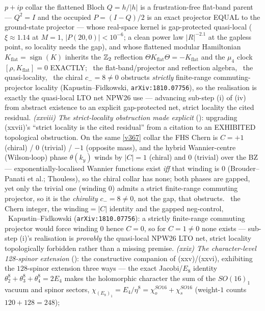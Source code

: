 $p{+}ip$ collar the flattened Bloch $Q{=}h/|h|$ is a frustration-free flat-band parent --- $Q^2{=}I$ and the
occupied $P{=}(I{-}Q)/2$ is an exact projector EQUAL to the ground-state projector --- whose real-space kernel is
gap-protected quasi-local ($\xi{\approx}1.14$ at $M{=}1$, $|P(20,0)|{<}10^{-6}$; a clean power law $|R|^{-2.1}$ at the
gapless point, so locality needs the gap), and whose flattened modular Hamiltonian $K_{\mathrm{flat}}{=}
\operatorname{sign}(K)$ inherits the $\mathbb Z_2$ reflection $\Theta K_{\mathrm{flat}}\Theta{=}{-}K_{\mathrm{flat}}$ and the
$\mu_4$ clock $[\rho,K_{\mathrm{flat}}]{=}0$ EXACTLY; \mE\ the flat-band/projector and reflection algebra, \mC\ the
quasi-locality, \mO\ the chiral $c_-{=}8{\neq}0$ obstructs \emph{strictly} finite-range commuting-projector locality
(Kapustin--Fidkowski, \texttt{arXiv:1810.07756}), so the realisation is exactly the quasi-local LTO net NPW26 use ---
advancing sub-step (i) of (iv) from abstract existence to an explicit gap-protected net, strict locality the cited
residual. \emph{(xxviii) The strict-locality obstruction made explicit} ():
upgrading (xxvii)'s ``strict locality is the cited residual'' from a citation to an EXHIBITED topological
obstruction. On the same \vref{v367} collar the FHS Chern is $C{=}{+}1$ (chiral) / $0$ (trivial) / $-1$
(opposite mass), and the hybrid Wannier-centre (Wilson-loop) phase $\theta(k_y)$ winds by $|C|{=}1$ (chiral) and
$0$ (trivial) over the BZ --- exponentially-localised Wannier functions exist \emph{iff} that winding is $0$
(Brouder--Panati et al.; Thouless), so the chiral collar has none; both phases are gapped, yet only the trivial one
(winding $0$) admits a strict finite-range commuting projector, so it is the \emph{chirality} $c_-{=}8{\neq}0$, not
the gap, that obstructs. \mE\ the Chern integer, the winding$={}|C|$ identity and the gapped neg-control, \mC\mO\
Kapustin--Fidkowski (\texttt{arXiv:1810.07756}): a strictly finite-range commuting projector would force winding
$0$ hence $C{=}0$, so for $C{=}1{\neq}0$ none exists --- sub-step (i)'s realisation is \emph{provably} the
quasi-local NPW26 LTO net, strict locality topologically forbidden rather than a missing premise. \emph{(xxix) The
character-level 128-spinor extension} (\veri{v462\_seam\_spinor\_continuum.py}): the constructive companion of
(xxv)/(xxvi), exhibiting the $128$-spinor extension three ways --- the exact Jacobi/$E_8$ identity
$\theta_2^8{+}\theta_3^8{+}\theta_4^8{=}2E_4$ makes the holomorphic character the sum of the $SO(16)_1$ vacuum and
spinor sectors, $\chi_{(E_8)_1}{=}E_4/\eta^8{=}\chi_o^{SO16}{+}\chi_s^{SO16}$ (weight-$1$ counts $120{+}128{=}248$);

